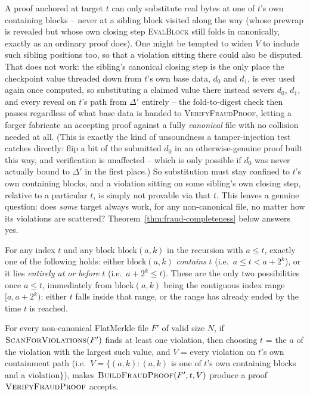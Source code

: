 \begin{remark}
\label{rem:fraud-completeness-caveat}
A proof anchored at target $t$ can only substitute real bytes at one of
$t$'s own containing blocks -- never at a sibling block visited along the
way (whose prewrap is revealed but whose own closing step
\textsc{EvalBlock} still folds in canonically, exactly as an ordinary
proof does). One might be tempted to widen $V$ to include such sibling
positions too, so that a violation sitting there could also be disputed.
That does not work: the sibling's canonical closing step is the only
place the checkpoint value threaded down from $t$'s own base data,
$d_0$ and $d_1$, is ever used again once computed, so substituting a
claimed value there instead severs $d_0$, $d_1$, and every reveal on
$t$'s path from $\Delta'$ entirely -- the fold-to-digest check then
passes regardless of what base data is handed to \textsc{VerifyFraudProof},
letting a forger fabricate an accepting proof against a fully
\emph{canonical} file with no collision needed at all. (This is exactly
the kind of unsoundness a tamper-injection test catches directly: flip a
bit of the submitted $d_0$ in an otherwise-genuine proof built this way,
and verification is unaffected -- which is only possible if $d_0$ was
never actually bound to $\Delta'$ in the first place.) So substitution
must stay confined to $t$'s own containing blocks, and a violation
sitting on some sibling's own closing step, relative to a particular $t$,
is simply not provable via that $t$. This leaves a genuine question: does
\emph{some} target always work, for any non-canonical file, no matter how
its violations are scattered? Theorem~\ref{thm:fraud-completeness} below
answers yes.
\end{remark}

\begin{lemma}
\label{lem:dyadic-containment}
For any index $t$ and any block $\mathrm{block}(a,k)$ in the recursion
with $a \le t$, exactly one of the following holds: either
$\mathrm{block}(a,k)$ \emph{contains} $t$ (i.e.\ $a \le t < a+2^k$), or it
lies \emph{entirely at or before} $t$ (i.e.\ $a+2^k \le t$). These are the
only two possibilities once $a \le t$, immediately from
$\mathrm{block}(a,k)$ being the contiguous index range $[a,a+2^k)$: either
$t$ falls inside that range, or the range has already ended by the time
$t$ is reached.
\end{lemma}

\begin{theorem}
\label{thm:fraud-completeness}
For every non-canonical FlatMerkle file $F'$ of valid size $N$, if
$\textsc{ScanForViolations}(F')$ finds at least one violation, then
choosing $t$ = the $a$ of the violation with the largest such value, and
$V$ = every violation on $t$'s own containment path (i.e.\
$V = \{(a,k) : (a,k)$ is one of $t$'s own containing blocks and a
violation$\}$), makes $\textsc{BuildFraudProof}(F', t, V)$ produce a proof
$\textsc{VerifyFraudProof}$ accepts.
\end{theorem}

